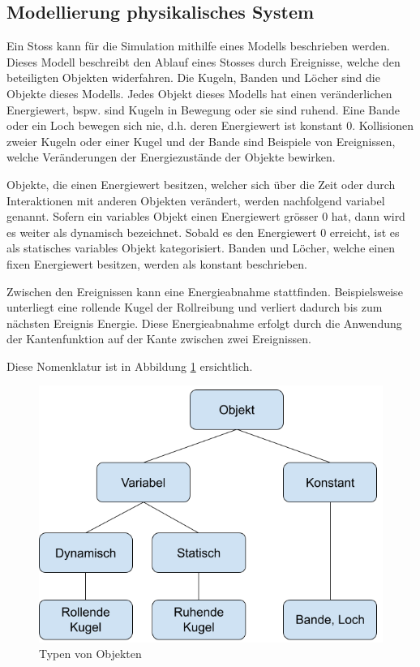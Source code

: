 \newpage
\subsection{Modellierung physikalisches System}\label{kap:physikalisches_system}
Ein Stoss kann für die Simulation mithilfe eines Modells beschrieben werden.
Dieses Modell beschreibt den Ablauf eines Stosses durch Ereignisse, welche den beteiligten Objekten widerfahren.
Die Kugeln, Banden und Löcher sind die Objekte dieses Modells.
Jedes Objekt dieses Modells hat einen veränderlichen Energiewert, bspw. sind Kugeln in Bewegung oder sie sind ruhend.
Eine Bande oder ein Loch bewegen sich nie, d.h. deren Energiewert ist konstant 0.
Kollisionen zweier Kugeln oder einer Kugel und der Bande sind Beispiele von Ereignissen, welche Veränderungen
der Energiezustände der Objekte bewirken.

Objekte, die einen Energiewert besitzen, welcher sich über die Zeit oder durch Interaktionen mit anderen Objekten verändert,
werden nachfolgend variabel genannt. Sofern ein variables Objekt einen Energiewert grösser 0 hat,
dann wird es weiter als dynamisch bezeichnet. Sobald es den Energiewert 0 erreicht, ist es als statisches
variables Objekt kategorisiert.
Banden und Löcher, welche einen fixen Energiewert besitzen, werden als konstant beschrieben.

Zwischen den Ereignissen kann eine Energieabnahme stattfinden. Beispielsweise unterliegt eine rollende Kugel der
Rollreibung und verliert dadurch bis zum nächsten Ereignis Energie.
Diese Energieabnahme erfolgt durch die Anwendung der Kantenfunktion auf der Kante zwischen zwei Ereignissen.

Diese Nomenklatur ist in Abbildung \ref{fig:physical_model_object_categories} ersichtlich.

\begin{figure}[h!]
    \begin{center}
        \includegraphics[width=0.5\linewidth]{../common/03_billiard_ai/resources/17_physical_model_categories.png}
    \end{center}
    \caption{Typen von Objekten}
    \label{fig:physical_model_object_categories}
\end{figure}


